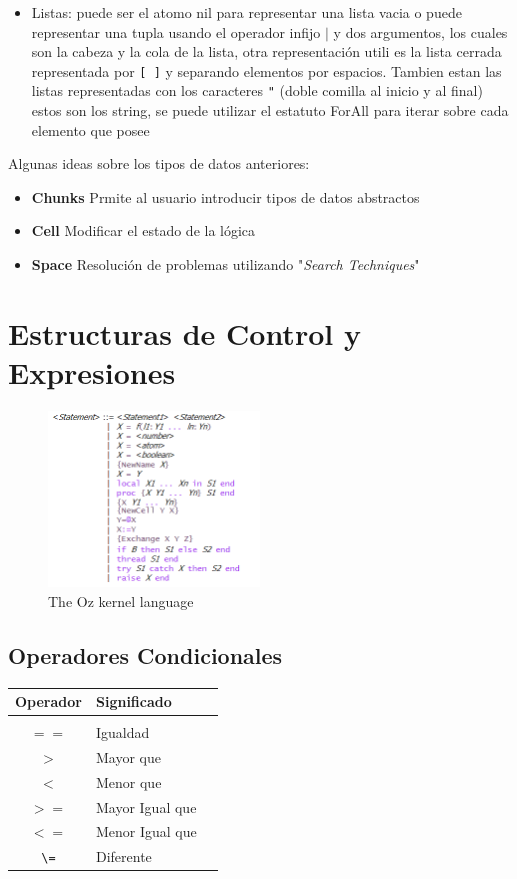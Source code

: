 \documentclass[10pt,journal,compsoc]{IEEEtran}
\begin{document}
\begin{itemize}
\begin{lstlisting}[language=Oz, caption = {Tupla}][linewidth=5.4cm]
<Etiqueta>(1:elemento1 2:elemento2)
\end{lstlisting}
	\item Listas: puede ser el atomo nil para representar una lista vacia o puede representar una tupla usando el operador infijo $\mid$ y dos argumentos, los cuales son la cabeza y la cola de la lista, otra representaci\'on utili es la lista cerrada representada por \verb|[ ]| y separando elementos por espacios. Tambien estan las listas representadas con los caracteres \verb|"| (doble comilla al inicio y al final) estos son los string, se puede utilizar el estatuto ForAll para iterar sobre cada elemento que posee
\end{itemize}
Algunas ideas sobre los tipos de datos anteriores:
\begin{itemize}
	\item \textbf{Chunks}
		\subitem Prmite al usuario introducir tipos de datos abstractos
	\item \textbf{Cell}
		\subitem Modificar el estado de la l\'ogica
	\item \textbf{Space}
		\subitem Resoluci\'on de problemas utilizando "\textit{Search Techniques}"
\end{itemize}

\section{Estructuras de Control y Expresiones}
\begin{figure}[h]
	\centering
	\includegraphics[width=0.5\textwidth]{struct.png}
	\caption{The Oz kernel language}
\end{figure}
\subsection{Operadores Condicionales}
\begin{tabular}{c p{3cm} p{5cm}}
	Operador & Significado\\
	\hline\hline\\
	$==$ & Igualdad\\
	$>$ & Mayor que\\
	$<$ & Menor que\\
	$>=$ & Mayor Igual que\\
	$<=$ &Menor Igual que\\
	\verb|\=| & Diferente\\
	\hline
\end{tabular}
\end{document}
